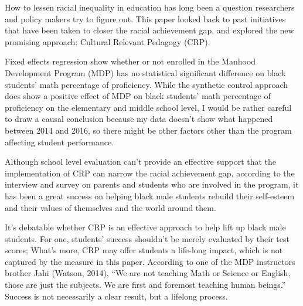 
How to lessen racial inequality in education has long been a question researchers and policy makers try to figure out. This paper looked back to past initiatives that have been taken to closer the racial achievement gap, and explored the new promising approach: Cultural Relevant Pedagogy (CRP). 

Fixed effects regression show whether or not enrolled in the Manhood Development Program (MDP) has no statistical significant difference on black students' math percentage of proficiency. While the synthetic control approach does show a positive effect of MDP on black students' math percentage of proficiency on the elementary and middle school level, I would be rather careful to draw a causal conclusion because my data doesn't show what happened between 2014 and 2016, so there might be other factors other than the program affecting student performance.

Although school level evaluation can't provide an effective support that the implementation of CRP can narrow the racial achievement gap, according to the interview and survey on parents and students who are involved in the program, it has been a great success on helping black male students rebuild their self-esteem and their values of themselves and the world around them. 

It's debatable whether CRP is an effective approach to help lift up black male students. For one, students' success shouldn't be merely evaluated by their test scores; What's more, CRP may offer students a life-long impact, which is not captured by the measure in this paper. According to one of the MDP instructors brother Jahi (Watson, 2014), “We are not teaching Math or Science or English, those are just the subjects. We are first and foremost teaching human beings.” Success is not necessarily a clear result, but a lifelong process.
